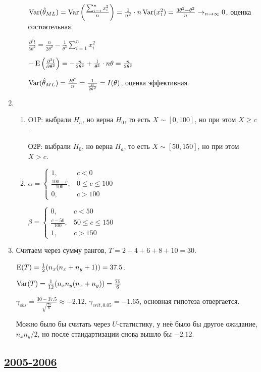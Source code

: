 \begin{enumerate}
\begin{enumerate}
$\operatorname{Var}(\hat{\theta}_{ML}) = \operatorname{Var}\left(\frac{\sum_{i=1}^n x_i^2}{n}\right) = \frac{1}{n^2}\cdot n \operatorname{Var}(x_1^2) = \frac{3\theta^2 - \theta^2}{n}\to_{n\to\infty} 0$,
оценка состоятельная.

$\frac{\partial^2 l}{\partial \theta^2} = \frac{n}{2 \theta^2} - \frac{1}{\theta^3}\sum_{i=1}^n x_i^2$

$-\operatorname{E}\left(\frac{\partial^2 l}{\partial \theta^2}\right) = -\frac{n}{2 \theta^2} + \frac{1}{\theta^3} \cdot n \theta = \frac{n}{2 \theta^2}$

$\operatorname{Var}(\hat{\theta}_{ML}) = \frac{2\theta^2}{n} = \frac{1}{\frac{n}{2 \theta^2}} = I(\theta)$,
оценка эффективная.
\end{enumerate}
\item
\begin{enumerate}
\item O1Р: выбрали $H_a$, но верна $H_0$, то есть $X \sim [0, 100]$, но при этом $X \geq c$.

О2Р: выбрали $H_0$, но верна $H_a$, то есть $X \sim [50, 150]$, но при этом $X > c$.
\item $\alpha = \begin{cases}
1, & c < 0 \\
\frac{100-c}{100}, & 0 \leq c \leq 100 \\
0, & c > 100
\end{cases}$

$\beta = \begin{cases}
0, & c < 50 \\
\frac{c-50}{100}, & 50 \leq c \leq 150 \\
1, & c > 150
\end{cases}$
\end{enumerate}
\item Считаем через сумму рангов, $T = 2 + 4 + 6 + 8 + 10 = 30$.

$\operatorname{E}(T) = \frac{1}{2}(n_x(n_x+n_y+1)) = 37.5$.

$\operatorname{Var}(T) = \frac{1}{12}(n_x n_y(n_x + n_y)) = \frac{75}{6}$

$\gamma_{obs} = \frac{30-37.5}{\sqrt{\frac{75}{6}}} \approx -2.12$,
$\gamma_{crit, 0.05} = -1.65$, основная гипотеза отвергается.

Можно было бы считать через $U$-статистику, у неё было бы другое ожидание, $n_x n_y/2$,
но после стандартизации снова вышло бы $-2.12$.

\end{enumerate}


\subsection[2005-2006]{\hyperref[sec:kr_03_2005_2006]{2005-2006}}
\label{sec:sol_kr_03_2005_2006}

